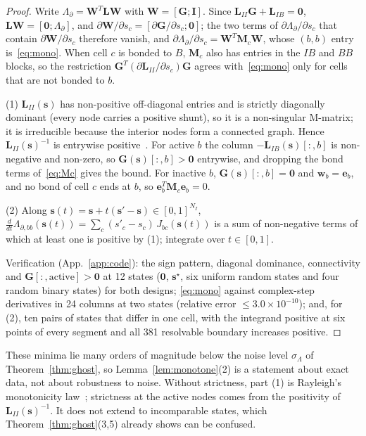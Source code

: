 \documentclass[11pt,a4paper]{article}
\theoremstyle{definition}
\theoremstyle{remark}
\begin{document}
\begin{proof}
Write $\Lambda_\partial = \mathbf{W}^T\mathbf{L}\mathbf{W}$ with $\mathbf{W} = [\mathbf{G};\mathbf{I}]$. Since $\mathbf{L}_{II}\mathbf{G}+\mathbf{L}_{IB} = \mathbf{0}$, $\mathbf{L}\mathbf{W} = [\mathbf{0};\Lambda_\partial]$, and $\partial\mathbf{W}/\partial s_c = [\partial\mathbf{G}/\partial s_c;\mathbf{0}]$; the two terms of $\partial\Lambda_\partial/\partial s_c$ that contain $\partial\mathbf{W}/\partial s_c$ therefore vanish, and $\partial\Lambda_\partial/\partial s_c = \mathbf{W}^T\mathbf{M}_c\mathbf{W}$, whose $(b,b)$ entry is~\eqref{eq:mono}. When cell $c$ is bonded to $B$, $\mathbf{M}_c$ also has entries in the $IB$ and $BB$ blocks, so the restriction $\mathbf{G}^T(\partial\mathbf{L}_{II}/\partial s_c)\mathbf{G}$ agrees with~\eqref{eq:mono} only for cells that are not bonded to $b$.

(1) $\mathbf{L}_{II}(\mathbf{s})$ has non-positive off-diagonal entries and is strictly diagonally dominant (every node carries a positive shunt), so it is a non-singular M-matrix; it is irreducible because the interior nodes form a connected graph. Hence $\mathbf{L}_{II}(\mathbf{s})^{-1}$ is entrywise positive~\cite{berman1994}. For active $b$ the column $-\mathbf{L}_{IB}(\mathbf{s})[:,b]$ is non-negative and non-zero, so $\mathbf{G}(\mathbf{s})[:,b] > \mathbf{0}$ entrywise, and dropping the bond terms of~\eqref{eq:Mc} gives the bound. For inactive $b$, $\mathbf{G}(\mathbf{s})[:,b] = \mathbf{0}$ and $\mathbf{w}_b = \mathbf{e}_b$, and no bond of cell $c$ ends at $b$, so $\mathbf{e}_b^T\mathbf{M}_c\mathbf{e}_b = 0$.

(2) Along $\mathbf{s}(t) = \mathbf{s}+t(\mathbf{s}'-\mathbf{s})\in[0,1]^{N_I}$, $\frac{d}{dt}\Lambda_{\partial,bb}(\mathbf{s}(t)) = \sum_c (s'_c-s_c)\,J_{bc}(\mathbf{s}(t))$ is a sum of non-negative terms of which at least one is positive by (1); integrate over $t\in[0,1]$.

Verification (App.~\ref{app:code}): the sign pattern, diagonal dominance, connectivity and $\mathbf{G}[:,\text{active}] > \mathbf{0}$ at 12 states ($\mathbf{0}$, $\mathbf{s}^\star$, six uniform random states and four random binary states) for both designs; \eqref{eq:mono} against complex-step derivatives in 24 columns at two states (relative error $\le 3.0\times10^{-10}$); and, for (2), ten pairs of states that differ in one cell, with the integrand positive at six points of every segment and all 381 resolvable boundary increases positive.
\end{proof}
These minima lie many orders of magnitude below the noise level $\sigma_\Lambda$ of Theorem~\ref{thm:ghost}, so Lemma~\ref{lem:monotone}(2) is a statement about exact data, not about robustness to noise. Without strictness, part (1) is Rayleigh's monotonicity law~\cite{doyle1984}; strictness at the active nodes comes from the positivity of $\mathbf{L}_{II}(\mathbf{s})^{-1}$. It does not extend to incomparable states, which Theorem~\ref{thm:ghost}(3,5) already shows can be confused.
\end{document}
